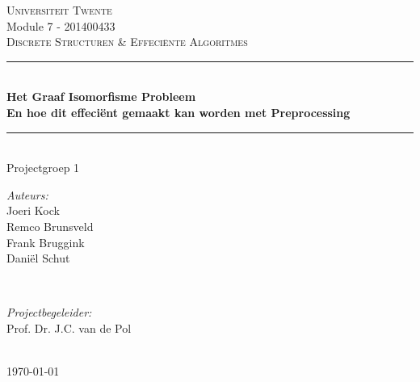 
\begin{titlepage}

\newcommand{\HRule}{\rule{\linewidth}{0.5mm}}

\center 		%
 

\textsc{\large Universiteit Twente}\\[1.5cm]
Module 7 - 201400433\\
\vspace{5mm}
\textsc{\Large Discrete Structuren \& Effeci\"ente Algoritmes}\\[0.5cm]


\HRule \\[0.4cm]
{ \huge \bfseries Het Graaf Isomorfisme Probleem}\\[0.4cm]
{ \large \bfseries En hoe dit effeci\"ent gemaakt kan worden met Preprocessing}\\[0.4cm]
\HRule \\[1.5cm]
 

Projectgroep 1\\
\vspace{10mm}
\begin{minipage}{0.4\textwidth}
\begin{flushleft} \large
\emph{Auteurs:}\\
Joeri Kock\\
Remco Brunsveld\\
Frank Bruggink\\
Dani\"el Schut
\end{flushleft}
\end{minipage}
~
\begin{minipage}{0.4\textwidth}
\begin{flushright} \large
\emph{Projectbegeleider:} \\
Prof. Dr. J.C. van de Pol
\end{flushright}
\end{minipage}\\[4cm]


{\large \today}\\[3cm]

\pagebreak 			%

\end{titlepage}